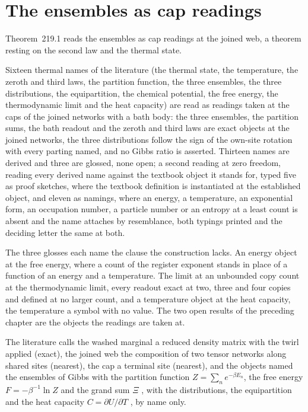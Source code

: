 \section{The ensembles as cap readings}\label{mod:XI-3-ensembles-as-cap-readings}
\label{narr:open:11-3}Theorem~219.1 reads the ensembles as cap readings at the joined web, a theorem resting on the second law and the thermal state.
\begin{chtheorem}\label{box:XI-3-ensembles-as-cap-readings:1}
Sixteen thermal names of the literature (the thermal state, the temperature, the zeroth and third laws, the partition function, the three ensembles, the three distributions, the equipartition, the chemical potential, the free energy, the thermodynamic limit and the heat capacity) are read as readings taken at the caps of the joined networks with a bath body: the three ensembles, the partition sums, the bath readout and the zeroth and third laws are exact objects at the joined networks, the three distributions follow the sign of the own-site rotation with every parting named, and no Gibbs ratio is asserted. Thirteen names are derived and three are glossed, none open; a second reading at zero freedom, reading every derived name against the textbook object it stands for, typed five as proof sketches, where the textbook definition is instantiated at the established object, and eleven as namings, where an energy, a temperature, an exponential form, an occupation number, a particle number or an entropy at a least count is absent and the name attaches by resemblance, both typings printed and the deciding letter the same at both.
\end{chtheorem}
The three glosses each name the clause the construction lacks. An energy object at the free energy, where a count of the register exponent stands in place of a function of an energy and a temperature. The limit at an unbounded copy count at the thermodynamic limit, every readout exact at two, three and four copies and defined at no larger count, and a temperature object at the heat capacity, the temperature a symbol with no value. The two open results of the preceding chapter are the objects the readings are taken at.
\begin{chbridge}
The literature calls the washed marginal a reduced density matrix with the twirl applied (exact), the joined web the composition of two tensor networks along shared sites (nearest), the cap a terminal site (nearest), and the objects named the ensembles of Gibbs with the partition function $Z = \sum_n e^{-\beta E_n}$, the free energy $F = -\beta^{-1}\ln Z$ and the grand sum $\Xi$ \cite{Gibbs1902}, with the distributions, the equipartition and the heat capacity $C = \partial U/\partial T$ \cite{Callen1985}, by name only.
\end{chbridge}
